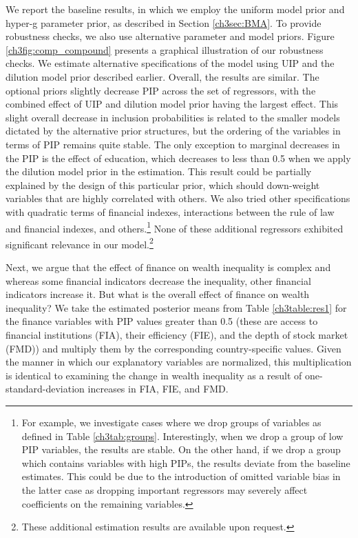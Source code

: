 \begin{refsection}
We report the baseline results, in which we employ the uniform model prior and hyper-g parameter prior, as described in Section \ref{ch3sec:BMA}. To provide robustness checks, we also use alternative parameter and model priors. Figure \ref{ch3fig:comp_compound} presents a graphical illustration of our robustness checks. We estimate alternative specifications of the model using \ac{UIP} and the dilution model prior described earlier. Overall, the results are similar. The optional priors slightly decrease \ac{PIP} across the set of regressors, with the combined effect of \ac{UIP} and dilution model prior having the largest effect. This slight overall decrease in inclusion probabilities is related to the smaller models dictated by the alternative prior structures, but the ordering of the variables in terms of \ac{PIP} remains quite stable. The only exception to marginal decreases in the \ac{PIP} is the effect of education, which decreases to less than 0.5 when we apply the dilution model prior in the estimation. This result could be partially explained by the design of this particular prior, which should down-weight variables that are highly correlated with others. We also tried other specifications with quadratic terms of financial indexes, interactions between the rule of law and financial indexes, and others.\footnote{For example, we investigate cases where we drop groups of variables as defined in Table \ref{ch3tab:groups}. Interestingly, when we drop a group of low \ac{PIP} variables, the results are stable. On the other hand, if we drop a group which contains variables with high \acp{PIP}, the results deviate from the baseline estimates. This could be due to the introduction of omitted variable bias in the latter case as dropping important regressors may severely affect coefficients on the remaining variables.} None of these additional regressors exhibited significant relevance in our model.\footnote{These additional estimation results are available upon request.}

Next, we argue that the effect of finance on wealth inequality is complex and whereas some financial indicators decrease the inequality, other financial indicators increase it. But what is the overall effect of finance on wealth inequality? We take the estimated posterior means from Table \ref{ch3table:res1} for the finance variables with \ac{PIP} values greater than 0.5 (these are access to financial institutions (FIA), their efficiency (FIE), and the depth of stock market (FMD)) and multiply them by the corresponding country-specific values. Given the manner in which our explanatory variables are normalized, this multiplication is identical to examining the change in wealth inequality as a result of one-standard-deviation increases in FIA, FIE, and FMD. 


\end{refsection}
